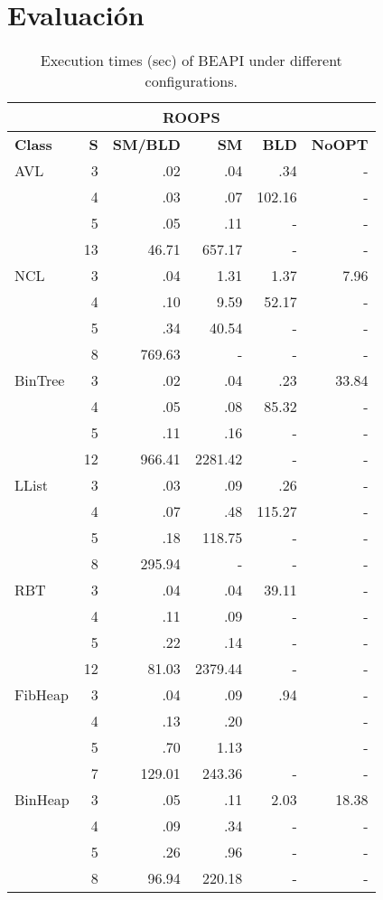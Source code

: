 \chapter[Evaluaci\'on]{Evaluaci\'on}
\label{cap:evaluation}


\begin{table}[!thb]
\caption{Execution times (sec) of BEAPI under different configurations.}
\tiny

\begin{minipage}{.48\textwidth}
\centering

\begin{tabular}{ l r | r | r | r | r  }
  \toprule
  \multicolumn{6}{c}{\textbf{ROOPS}} \\
  \midrule 
  \textbf{Class} & \textbf{S} & \textbf{SM/BLD} & \textbf{SM}  & \textbf{BLD} & \textbf{NoOPT}  \\
  \midrule
  AVL
  & 3& .02 & .04 & .34 & - \\ 
  & 4& .03 & .07 & 102.16 & - \\ 
  & 5& .05 & .11 & - & - \\ 
  & 13& 46.71 & 657.17 & - & - \\ 
  \midrule
  NCL
  & 3& .04 & 1.31 & 1.37 & 7.96 \\ 
  & 4& .10 & 9.59 & 52.17 & - \\ 
  & 5& .34 & 40.54 & - & - \\ 
  & 8& 769.63 & - & - &  -\\ 
  \midrule
  BinTree
  & 3& .02 & .04 & .23 & 33.84 \\ 
  & 4& .05 & .08 & 85.32 & - \\ 
  & 5& .11 & .16 & - & - \\ 
  & 12& 966.41 & 2281.42 & - & - \\ 
  \midrule
  LList
  & 3& .03 & .09 & .26 & - \\ 
  & 4& .07 & .48 & 115.27 & - \\ 
  & 5& .18 & 118.75 & - & - \\ 
  & 8& 295.94 & - & - & - \\ 
  \midrule
  RBT
  & 3& .04 & .04 & 39.11 & - \\ 
  & 4& .11 & .09 & - & - \\ 
  & 5& .22 & .14 & - & - \\ 
  & 12& 81.03 & 2379.44 & - & - \\ 
  \midrule
  FibHeap
  & 3& .04 & .09 & .94 & - \\ 
  & 4& .13 & .20 &  & - \\ 
  & 5& .70 & 1.13 &  & - \\ 
  & 7& 129.01 & 243.36 & - & - \\ 
  \midrule
  BinHeap
  & 3& .05 & .11 & 2.03 & 18.38 \\ 
  & 4& .09 & .34 & - & - \\ 
  & 5& .26 & .96 & - & - \\  
  & 8& 96.94 & 220.18 & - & - \\ 
  \bottomrule


\end{tabular}
\end{minipage}
\end{table}
